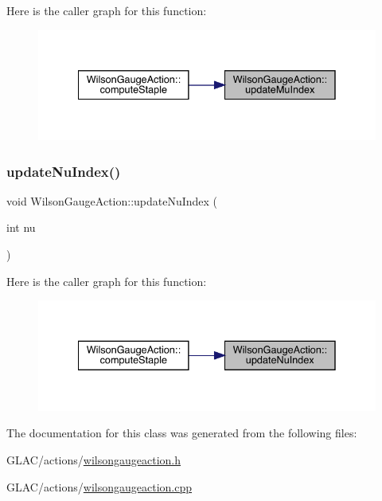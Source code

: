 Here is the caller graph for this function\+:\nopagebreak
\begin{figure}[H]
\begin{center}
\leavevmode
\includegraphics[width=335pt]{class_wilson_gauge_action_ab7ed4ab8e475f5a188cd19ce720a5eb9_icgraph}
\end{center}
\end{figure}
\mbox{\label{class_wilson_gauge_action_a010b3b8870476dfec4c48a01b6d6fc1d}} 
\subsubsection{\texorpdfstring{updateNuIndex()}{updateNuIndex()}}
{\footnotesize\ttfamily void Wilson\+Gauge\+Action\+::update\+Nu\+Index (\begin{DoxyParamCaption}\item[{int}]{nu }\end{DoxyParamCaption})\hspace{0.3cm}{\ttfamily [inline]}}

Here is the caller graph for this function\+:\nopagebreak
\begin{figure}[H]
\begin{center}
\leavevmode
\includegraphics[width=335pt]{class_wilson_gauge_action_a010b3b8870476dfec4c48a01b6d6fc1d_icgraph}
\end{center}
\end{figure}


The documentation for this class was generated from the following files\+:\begin{DoxyCompactItemize}
\item 
G\+L\+A\+C/actions/\mbox{\hyperlink{wilsongaugeaction_8h}{wilsongaugeaction.\+h}}\item 
G\+L\+A\+C/actions/\mbox{\hyperlink{wilsongaugeaction_8cpp}{wilsongaugeaction.\+cpp}}\end{DoxyCompactItemize}
